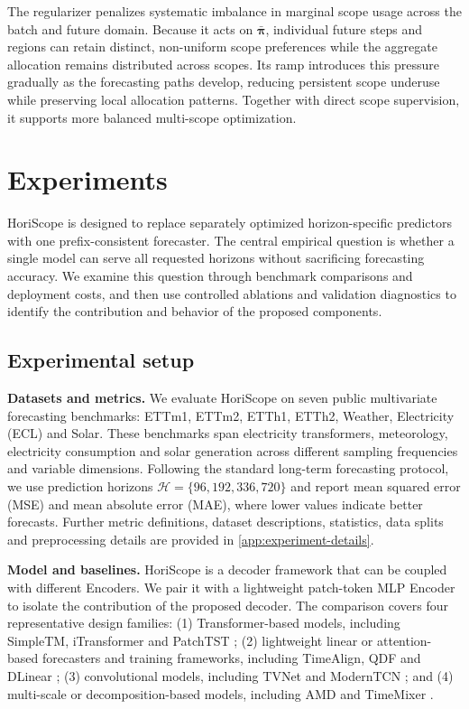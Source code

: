 \documentclass[final,3p,times]{elsarticle}
\begin{document}
The regularizer penalizes systematic imbalance in marginal scope usage across the batch and future domain. Because it acts on $\bar{\boldsymbol\pi}$, individual future steps and regions can retain distinct, non-uniform scope preferences while the aggregate allocation remains distributed across scopes. Its ramp introduces this pressure gradually as the forecasting paths develop, reducing persistent scope underuse while preserving local allocation patterns. Together with direct scope supervision, it supports more balanced multi-scope optimization.

\section{Experiments}
\label{sec:experiments}


HoriScope is designed to replace separately optimized horizon-specific predictors with one prefix-consistent forecaster. The central empirical question is whether a single model can serve all requested horizons without sacrificing forecasting accuracy. We examine this question through benchmark comparisons and deployment costs, and then use controlled ablations and validation diagnostics to identify the contribution and behavior of the proposed components.

\subsection{Experimental setup}


\textbf{Datasets and metrics.} We evaluate HoriScope on seven public multivariate forecasting benchmarks: ETTm1, ETTm2, ETTh1, ETTh2, Weather, Electricity (ECL) and Solar. These benchmarks span electricity transformers, meteorology, electricity consumption and solar generation across different sampling frequencies and variable dimensions. Following the standard long-term forecasting protocol, we use prediction horizons $\mathcal H=\{96,192,336,720\}$ and report mean squared error (MSE) and mean absolute error (MAE), where lower values indicate better forecasts. Further metric definitions, dataset descriptions, statistics, data splits and preprocessing details are provided in \ref{app:experiment-details}.

\textbf{Model and baselines.} HoriScope is a decoder framework that can be coupled with different Encoders. We pair it with a lightweight patch-token MLP Encoder to isolate the contribution of the proposed decoder. The comparison covers four representative design families: (1) Transformer-based models, including SimpleTM, iTransformer and PatchTST \citep{chen2025simpletm,liu2024itransformer,nie2023patchtst}; (2) lightweight linear or attention-based forecasters and training frameworks, including TimeAlign, QDF and DLinear \citep{hu2026timealign,wang2026qdf,zeng2023dlinear}; (3) convolutional models, including TVNet and ModernTCN \citep{li2025tvnet,luo2024moderntcn}; and (4) multi-scale or decomposition-based models, including AMD and TimeMixer \citep{hu2025amd,wang2024timemixer}.
\end{document}
